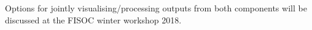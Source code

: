 \documentclass[12pt]{article}
\begin{document}
Options for jointly visualising/processing outputs from both components 
will be discussed at the FISOC winter workshop 2018.








\end{document}
